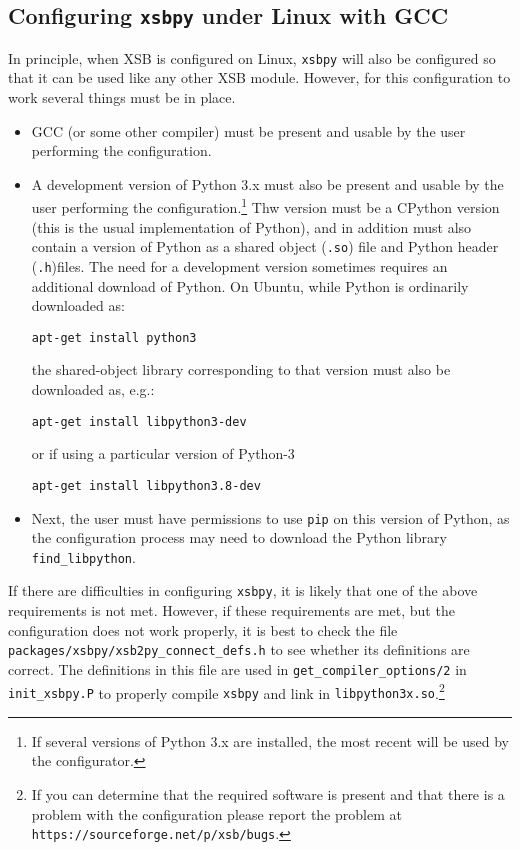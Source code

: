 \subsection{Configuring {\tt xsbpy} under Linux with GCC}

In principle, when XSB is configured on Linux, {\tt xsbpy} will also
be configured so that it can be used like any other XSB module.
However, for this configuration to work several things must be in
place.

\begin{itemize}
\item GCC (or some other compiler) must be present and usable by the
  user performing the configuration.

\item A development version of Python 3.x must also be present and
  usable by the user performing the configuration.\footnote{If several
    versions of Python 3.x are installed, the most recent will be used
    by the configurator.}  Thw version must be a CPython version (this
  is the usual implementation of Python), and in addition must also
  contain a version of Python as a shared object ({\tt .so}) file and
  Python header ({\tt .h})files.  The need for a development version
  sometimes requires an additional download of Python.  On Ubuntu,
  while Python is ordinarily downloaded as:

  {\tt apt-get install python3}

\noindent
the shared-object library corresponding to that version must also be
downloaded as, e.g.:

{\tt apt-get install libpython3-dev}

or if using a particular version of Python-3

{\tt apt-get install libpython3.8-dev}

\item Next, the user must have permissions to use {\tt pip} on this
  version of Python, as the configuration process may need to download
  the Python library {\tt find\_libpython}.
\end{itemize}

If there are difficulties in configuring {\tt xsbpy}, it is likely
that one of the above requirements is not met.  However, if these
requirements are met, but the configuration does not work properly, it
is best to check the file {\tt packages/xsbpy/xsb2py\_connect\_defs.h} to see whether
its definitions are correct.  The definitions in this file are used in
{\tt get\_compiler\_options/2} in {\tt init\_xsbpy.P} to properly
compile {\tt xsbpy} and link in {\tt libpython3x.so}.\footnote{If you
  can determine that the required software is present and that there
  is a problem with the configuration please report the problem at
  {\tt https://sourceforge.net/p/xsb/bugs}.}

